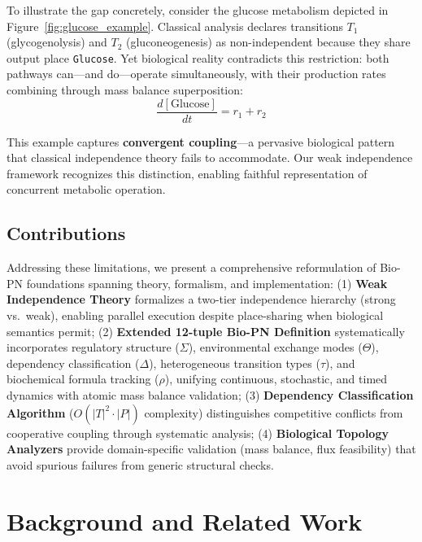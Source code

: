 \documentclass[twocolumn,11pt]{article}
\begin{document}
To illustrate the gap concretely, consider the glucose metabolism depicted in Figure~\ref{fig:glucose_example}. Classical analysis declares transitions $T_1$ (glycogenolysis) and $T_2$ (gluconeogenesis) as non-independent because they share output place \texttt{Glucose}. Yet biological reality contradicts this restriction: both pathways can---and do---operate simultaneously, with their production rates combining through mass balance superposition:
\begin{equation}
\frac{d[\text{Glucose}]}{dt} = r_1 + r_2
\end{equation}

\noindent This example captures \textbf{convergent coupling}---a pervasive biological pattern that classical independence theory fails to accommodate. Our weak independence framework recognizes this distinction, enabling faithful representation of concurrent metabolic operation.

\subsection{Contributions}
Addressing these limitations, we present a comprehensive reformulation of Bio-PN foundations spanning theory, formalism, and implementation: (1) \textbf{Weak Independence Theory} formalizes a two-tier independence hierarchy (strong vs.\ weak), enabling parallel execution despite place-sharing when biological semantics permit; (2) \textbf{Extended 12-tuple Bio-PN Definition} systematically incorporates regulatory structure ($\Sigma$), environmental exchange modes ($\Theta$), dependency classification ($\Delta$), heterogeneous transition types ($\tau$), and biochemical formula tracking ($\rho$), unifying continuous, stochastic, and timed dynamics with atomic mass balance validation; (3) \textbf{Dependency Classification Algorithm} ($O(|T|^2 \cdot |P|)$ complexity) distinguishes competitive conflicts from cooperative coupling through systematic analysis; (4) \textbf{Biological Topology Analyzers} provide domain-specific validation (mass balance, flux feasibility) that avoid spurious failures from generic structural checks.

\section{Background and Related Work}
\end{document}
